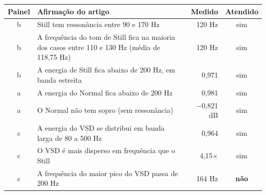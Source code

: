 \begin{tabularx}{\textwidth}{cXrc}
\toprule
\textbf{Painel} & \textbf{Afirmação do artigo} & \textbf{Medido} & \textbf{Atendido} \\
\midrule
b & Still tem ressonância entre 90 e 170 Hz & 120 Hz & sim \\
b & A frequência do tom de Still fica na maioria dos casos entre 110 e 130 Hz (média de 118,75 Hz) & 120 Hz & sim \\
b & A energia de Still fica abaixo de 200 Hz, em banda estreita & 0{,}971 & sim \\
a & A energia do Normal fica abaixo de 200 Hz & 0{,}981 & sim \\
a & O Normal não tem sopro (sem ressonância) & $-$0{,}821 dB & sim \\
c & A energia do VSD se distribui em banda larga de 80 a 500 Hz & 0{,}964 & sim \\
c & O VSD é mais disperso em frequência que o Still & 4{,}15$\times$ & sim \\
c & A frequência do maior pico do VSD passa de 200 Hz & 164 Hz & \textbf{não} \\
\bottomrule
\end{tabularx}
